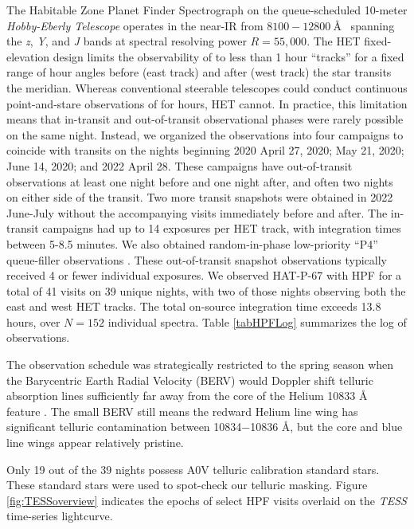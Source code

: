 \documentclass[twocolumn]{aastex631}
\begin{document}
The Habitable Zone Planet Finder Spectrograph \citep[HPF;][]{2012SPIE.8446E..1SM,2014SPIE.9147E..1GM, 2019Optic...6..233M} on the queue-scheduled 10-meter \emph{Hobby-Eberly Telescope} \citep[HET;][]{1998SPIE.3352...34R} operates in the near-IR from $8100-12800~$\AA~ spanning the \textit{z}, \textit{Y}, and \textit{J} bands at spectral resolving power $R=55,000$. The HET fixed-elevation design \citep{2007PASP..119..556S} limits the observability of  to less than 1 hour ``tracks'' for a fixed range of hour angles before (east track) and after (west track) the star transits the meridian.  Whereas conventional steerable telescopes could conduct continuous point-and-stare observations of  for hours, HET cannot.  In practice, this limitation means that in-transit and out-of-transit observational phases were rarely possible on the same night.  Instead, we organized the observations into four campaigns to coincide with  transits on the nights beginning 2020 April 27, 2020; May 21, 2020; June 14, 2020; and 2022 April 28.  These campaigns have out-of-transit observations at least one night before and one night after, and often two nights on either side of the transit.  Two more transit snapshots were obtained in 2022 June-July without the accompanying visits immediately before and after.  The in-transit campaigns had up to 14 exposures per HET track, with integration times between 5-8.5 minutes.  We also obtained random-in-phase low-priority ``P4'' queue-filler observations \citep{2007PASP..119..556S}.  These out-of-transit snapshot observations typically received 4 or fewer individual exposures.  We observed HAT-P-67 with HPF for a total of 41 visits on 39 unique nights, with two of those nights observing both the east and west HET tracks.  The total on-source integration time exceeds 13.8 hours, over $N=152$ individual spectra.  Table \ref{tabHPFLog} summarizes the log of observations.

The observation schedule was strategically restricted to the spring season when the Barycentric Earth Radial Velocity (BERV) would Doppler shift telluric absorption lines sufficiently far away from the core of the Helium 10833 \AA~ feature \citep{2022ApJ...939L..11S}.  The small BERV still means the redward Helium line wing has significant telluric contamination between 10834$-$10836 \AA, but the core and blue line wings appear relatively pristine.

Only 19 out of the 39 nights possess A0V telluric calibration standard stars.  These standard stars were used to spot-check our telluric masking.  Figure \ref{fig:TESSoverview} indicates the epochs of select HPF visits overlaid on the \emph{TESS} time-series lightcurve.
\end{document}
